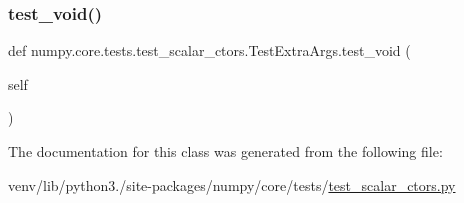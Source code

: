 \subsubsection{\texorpdfstring{test\+\_\+void()}{test\_void()}}
{\footnotesize\ttfamily def numpy.\+core.\+tests.\+test\+\_\+scalar\+\_\+ctors.\+Test\+Extra\+Args.\+test\+\_\+void (\begin{DoxyParamCaption}\item[{}]{self }\end{DoxyParamCaption})}



The documentation for this class was generated from the following file\+:\begin{DoxyCompactItemize}
\item 
venv/lib/python3./site-\/packages/numpy/core/tests/\hyperlink{test__scalar__ctors_8py}{test\+\_\+scalar\+\_\+ctors.\+py}\end{DoxyCompactItemize}
